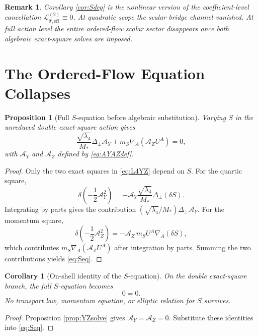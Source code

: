 \documentclass[11pt]{article}
\newcommand{\AY}{\mathcal A_Y}
\newcommand{\AZ}{\mathcal A_Z}
\newtheorem{proposition}{Proposition}
\newtheorem{remark}{Remark}
\newtheorem{corollary}{Corollary}
\begin{document}
\begin{remark}
Corollary \ref{cor:Sdeg} is the nonlinear version of the coefficient-level cancellation \(\mathcal L_{\hat\sigma,\mathrm{eff}}^{(2)}\equiv 0\). At quadratic scope the scalar bridge channel vanished. At full action level the entire ordered-flow scalar sector disappears once both algebraic exact-square solves are imposed.
\end{remark}

\section{The Ordered-Flow Equation Collapses}

\begin{proposition}[Full \(S\)-equation before algebraic substitution]
\label{prop:Seq}
Varying \(S\) in the unreduced double exact-square action gives
\begin{equation}
\frac{\sqrt{\lambda_4}}{M_*}\Delta_\perp \AY
+m_S\nabla_A(\AZ U^A)
=
0,
\label{eq:Seq}
\end{equation}
with \(\AY\) and \(\AZ\) defined by \eqref{eq:AYAZdef}.
\end{proposition}

\begin{proof}
Only the two exact squares in \eqref{eq:L4YZ} depend on \(S\). For the quartic square,
\[
\delta\!\left(-\frac12\AY^2\right)
=
-\AY\frac{\sqrt{\lambda_4}}{M_*}\Delta_\perp(\delta S).
\]
Integrating by parts gives the contribution \((\sqrt{\lambda_4}/M_*)\Delta_\perp\AY\). For the momentum square,
\[
\delta\!\left(-\frac12\AZ^2\right)
=
-\AZ\,m_SU^A\nabla_A(\delta S),
\]
which contributes \(m_S\nabla_A(\AZ U^A)\) after integration by parts. Summing the two contributions yields \eqref{eq:Seq}.
\end{proof}

\begin{corollary}[On-shell identity of the \(S\)-equation]
\label{cor:identity}
On the double exact-square branch, the full \(S\)-equation becomes
\begin{equation}
0=0.
\label{eq:zerozero}
\end{equation}
No transport law, momentum equation, or elliptic relation for \(S\) survives.
\end{corollary}

\begin{proof}
Proposition \ref{prop:YZsolve} gives \(\AY=\AZ=0\). Substitute these identities into \eqref{eq:Seq}.
\end{proof}
\end{document}
